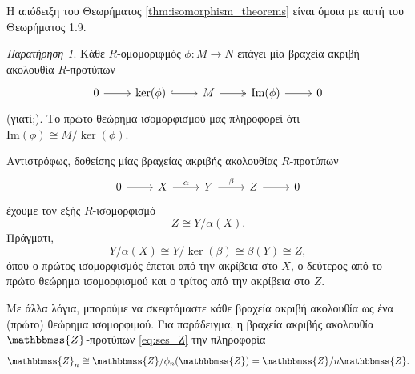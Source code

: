 \documentclass[12pt,a4paper,reqno]{amsart}
\theoremstyle{definition}
\theoremstyle{remark}
\newtheorem*{remark}{Παρατήρηση}
\numberwithin{theorem}{section}
\numberwithin{exercise}{section}
\numberwithin{equation}{section}
\newcommand{\ZZ}{\mathbbmss{Z}}
\renewcommand{\to}{\rightarrow}
\newcommand{\rmIm}{\mathrm{Im}}
\begin{document}
Η απόδειξη του Θεωρήματος \ref{thm:isomorphism_theorems} είναι όμοια με αυτή του Θεωρήματος 1.9.
\begin{remark}
    Κάθε $R$-ομομοριφμός $\phi : M \to N$ επάγει μία βραχεία ακριβή ακολουθία $R$-προτύπων
    \[
    \begin{tikzcd}
        0 \arrow[r] & \ker(\phi) \arrow[r, hook] & M \arrow[r, two heads] & \rmIm(\phi) \arrow[r] & 0
    \end{tikzcd}
    \]
    (γιατί;). Το πρώτο θεώρημα ισομορφισμού μας πληροφορεί ότι 
    $\rmIm(\phi) \cong M/\ker(\phi)$.

    Αντιστρόφως, δοθείσης μίας βραχείας ακριβής ακολουθίας $R$-προτύπων
    \[
    \begin{tikzcd}
        0 \arrow[r] & X \arrow[r, "\alpha"] & Y \arrow[r, "\beta"] & Z \arrow[r] & 0
    \end{tikzcd}
    \]
    έχουμε τον εξής $R$-ισομορφισμό
    \[
    Z \cong Y/\alpha(X).
    \]
    Πράγματι, 
    \[
    Y/\alpha(X) \cong Y/\ker(\beta) \cong \beta(Y) \cong Z,
    \]
    όπου ο πρώτος ισομορφισμός έπεται από την ακρίβεια στο $X$, ο δεύτερος από το πρώτο θεώρημα ισομορφισμού και ο τρίτος από την ακρίβεια στο $Z$.

    Με άλλα λόγια, μπορούμε να σκεφτόμαστε κάθε βραχεία ακριβή ακολουθία ως ένα (πρώ\-το) θεώρημα ισομορφιμού. Για παράδειγμα, η βραχεία ακριβής ακολουθία $\ZZ$-προτύπων \eqref{eq:ses_Z}  την πληροφορία 
    \[
    \ZZ_n \cong \ZZ/\phi_n(\ZZ) = \ZZ/n\ZZ.
    \]
\end{remark}

\end{document}
